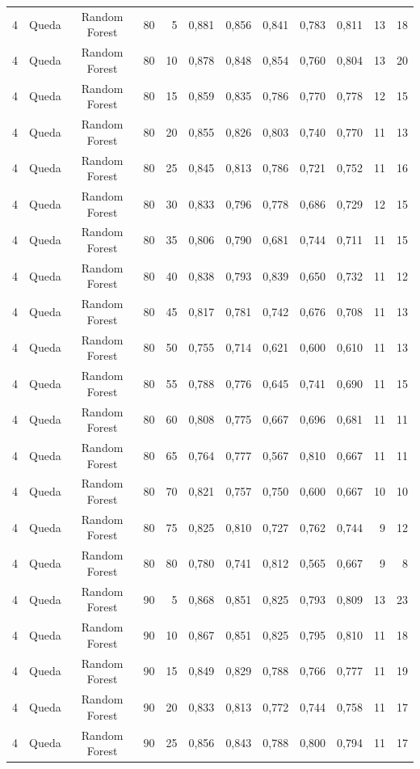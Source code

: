 \begin{longtable}{ccclrrrrrrrr}
4 & Queda & Random Forest & 80 & 5 & 0,881 & 0,856 & 0,841 & 0,783 & 0,811 & 13 & 18 \\
4 & Queda & Random Forest & 80 & 10 & 0,878 & 0,848 & 0,854 & 0,760 & 0,804 & 13 & 20 \\
4 & Queda & Random Forest & 80 & 15 & 0,859 & 0,835 & 0,786 & 0,770 & 0,778 & 12 & 15 \\
4 & Queda & Random Forest & 80 & 20 & 0,855 & 0,826 & 0,803 & 0,740 & 0,770 & 11 & 13 \\
4 & Queda & Random Forest & 80 & 25 & 0,845 & 0,813 & 0,786 & 0,721 & 0,752 & 11 & 16 \\
4 & Queda & Random Forest & 80 & 30 & 0,833 & 0,796 & 0,778 & 0,686 & 0,729 & 12 & 15 \\
4 & Queda & Random Forest & 80 & 35 & 0,806 & 0,790 & 0,681 & 0,744 & 0,711 & 11 & 15 \\
4 & Queda & Random Forest & 80 & 40 & 0,838 & 0,793 & 0,839 & 0,650 & 0,732 & 11 & 12 \\
4 & Queda & Random Forest & 80 & 45 & 0,817 & 0,781 & 0,742 & 0,676 & 0,708 & 11 & 13 \\
4 & Queda & Random Forest & 80 & 50 & 0,755 & 0,714 & 0,621 & 0,600 & 0,610 & 11 & 13 \\
4 & Queda & Random Forest & 80 & 55 & 0,788 & 0,776 & 0,645 & 0,741 & 0,690 & 11 & 15 \\
4 & Queda & Random Forest & 80 & 60 & 0,808 & 0,775 & 0,667 & 0,696 & 0,681 & 11 & 11 \\
4 & Queda & Random Forest & 80 & 65 & 0,764 & 0,777 & 0,567 & 0,810 & 0,667 & 11 & 11 \\
4 & Queda & Random Forest & 80 & 70 & 0,821 & 0,757 & 0,750 & 0,600 & 0,667 & 10 & 10 \\
4 & Queda & Random Forest & 80 & 75 & 0,825 & 0,810 & 0,727 & 0,762 & 0,744 & 9 & 12 \\
4 & Queda & Random Forest & 80 & 80 & 0,780 & 0,741 & 0,812 & 0,565 & 0,667 & 9 & 8 \\
4 & Queda & Random Forest & 90 & 5 & 0,868 & 0,851 & 0,825 & 0,793 & 0,809 & 13 & 23 \\
4 & Queda & Random Forest & 90 & 10 & 0,867 & 0,851 & 0,825 & 0,795 & 0,810 & 11 & 18 \\
4 & Queda & Random Forest & 90 & 15 & 0,849 & 0,829 & 0,788 & 0,766 & 0,777 & 11 & 19 \\
4 & Queda & Random Forest & 90 & 20 & 0,833 & 0,813 & 0,772 & 0,744 & 0,758 & 11 & 17 \\
4 & Queda & Random Forest & 90 & 25 & 0,856 & 0,843 & 0,788 & 0,800 & 0,794 & 11 & 17 \\

\end{longtable}
